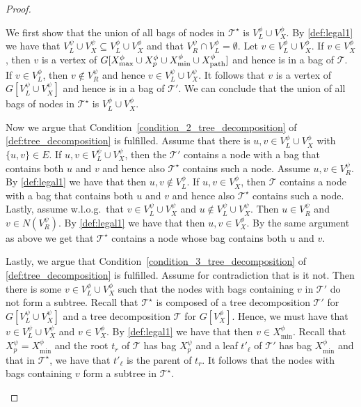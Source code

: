 \documentclass[a4paper,UKenglish,cleveref, autoref, thm-restate, numberwithinsect]{lipics-v2021}
\newcommand{\dpath}{\textup{path}}
\begin{document}
\begin{proof}
\begin{enumerate}
We first show that the union of all bags of nodes in $\mathcal{T}^\star$ is $V^\phi_L\cup V^\phi_X$.
By \cref{def:legal1} we have that $V^\psi_L\cup V^\psi_X\subseteq V^\phi_L\cup V^\phi_X$ and that $V^\psi_R\cap V^\phi_L=\emptyset$. Let $v\in V^\phi_L\cup V^\phi_X$. If $v\in V^\phi_X$, then $v$ is a vertex of $G[X^\phi_{\max}\cup X^\phi_p\cup X^\phi_{\min}\cup X^\phi_{\dpath}]$ and hence is in a bag of $\mathcal{T}$. If $v\in V^\phi_L$, then $v\notin V^\psi_R$ and hence $v\in V^\psi_L\cup V^\psi_X$. It follows that $v$ is a vertex of $G[V^\psi_L\cup V^\psi_X]$ and hence is in a bag of $\mathcal{T}'$.
We can conclude that the union of all bags of nodes in $\mathcal{T}^\star$ is $V^\phi_L\cup V^\phi_X$.

Now we argue that Condition~\ref{condition_2_tree_decomposition} of \cref{def:tree_decomposition} is fulfilled. Assume that there is $u,v\in V^\phi_L\cup V^\phi_X$ with $\{u,v\}\in E$. If $u,v\in V^\psi_L\cup V^\psi_X$, then the $\mathcal{T}'$ contains a node with a bag that contains both $u$ and $v$ and hence also $\mathcal{T}^\star$ contains such a node. Assume $u,v\in V^\psi_R$. By \cref{def:legal1} we have that then $u,v\notin V^\phi_L$. If $u,v\in V^\phi_X$, then $\mathcal{T}$ contains a node with a bag that contains both $u$ and $v$ and hence also $\mathcal{T}^\star$ contains such a node.
Lastly, assume w.l.o.g.\ that $v\in V^\psi_L\cup V^\psi_X$ and $u\notin V^\psi_L\cup V^\psi_X$. Then $u\in V^\psi_R$ and $v\in N(V^\psi_R)$. By \cref{def:legal1} we have that then $u,v\in V^\phi_X$. By the same argument as above we get that $\mathcal{T}^\star$ contains a node whose bag contains both $u$ and $v$.

Lastly, we argue that Condition~\ref{condition_3_tree_decomposition} of \cref{def:tree_decomposition} is fulfilled. Assume for contradiction that is it not. 
Then there is some $v\in V^\phi_L\cup V^\phi_X$ such that
the nodes with bags containing $v$ in $\mathcal{T}'$ do not form a subtree. Recall that $\mathcal{T}^\star$ is composed of a tree decomposition $\mathcal{T}'$ for $G[V^\psi_L\cup V^\psi_X]$ and a tree decomposition $\mathcal{T}$ for $G[V^\phi_X]$. Hence, we must have that $v\in V^\psi_L\cup V^\psi_X$ and $v\in V^\phi_X$. By \cref{def:legal1} we have that then $v\in X^\phi_{\min}$. Recall that 
$X^\psi_p=X^\phi_{\min}$ and the root $t_r$ of $\mathcal{T}$ has bag $X^\psi_p$ and a leaf $t'_\ell$ of $\mathcal{T}'$ has bag $X^\phi_{\min}$ and that in $\mathcal{T}^\star$, we have that $t'_\ell$ is the parent of $t_r$. It follows that the nodes with bags containing $v$ form a subtree in $\mathcal{T}^\star$.







\end{enumerate}
\end{proof}
\end{document}
